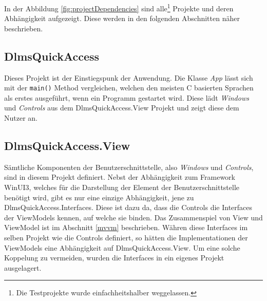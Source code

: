 In der Abbildung \ref{fig:projectDependencies} sind alle\footnote{Die Testprojekte wurde einfachheitshalber weggelassen.} Projekte und deren Abhängigkeit aufgezeigt.
Diese werden in den folgenden Abschnitten näher beschrieben.

\subsection{DlmsQuickAccess}
Dieses Projekt ist der Einstiegspunk der Anwendung.
Die Klasse \textit{App} lässt sich mit der \texttt{main()} Method vergleichen, welchen den meisten C basierten Sprachen als erstes ausgeführt, wenn ein Programm gestartet wird.
Diese lädt \textit{Windows} und \textit{Controls} aus dem DlmsQuickAccess.View Projekt und zeigt diese dem Nutzer an.



\subsection{DlmsQuickAccess.View}
Sämtliche Komponenten der Benutzerschnittstelle, also \textit{Windows} und \textit{Controls}, sind in diesem Projekt definiert. 
Nebst der Abhängigkeit zum Framework WinUI3, welches für die Darstellung der Element der Benutzerschnittstelle benötigt wird, gibt es nur eine einzige Abhängigkeit, jene zu DlmsQuickAccess.Interfaces.
Diese ist dazu da, dass die Controls die Interfaces der ViewModels kennen, auf welche sie binden.
Das Zusammenspiel von View und ViewModel ist im Abschnitt \ref{mvvm} beschrieben.
Währen diese Interfaces im selben Projekt wie die Controls definiert, so hätten die Implementationen der ViewModels eine Abhängigkeit auf DlmsQuickAccess.View.
Um eine solche Koppelung zu vermeiden, wurden die Interfaces in ein eigenes Projekt ausgelagert.


